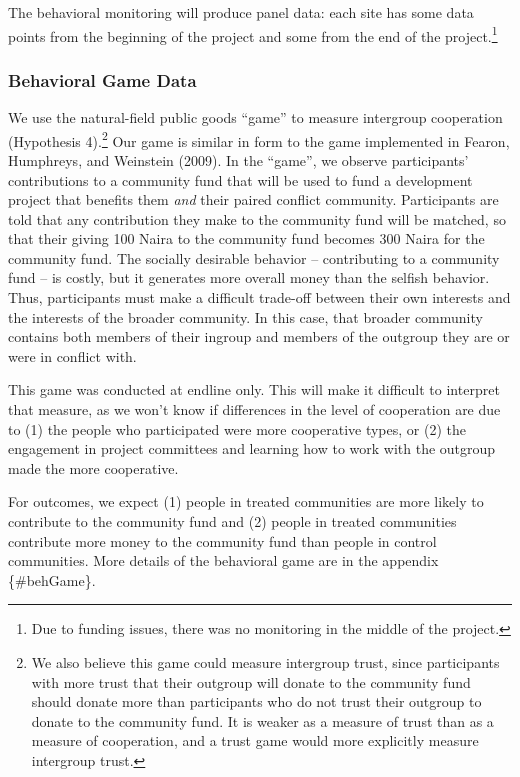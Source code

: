 \documentclass[
]{article}
\begin{document}
The behavioral monitoring will produce panel data: each site has some
data points from the beginning of the project and some from the end of
the project.\footnote{Due to funding issues, there was no monitoring in
  the middle of the project.}

\hypertarget{behavioral-game-data}{%
\subsubsection{Behavioral Game Data}\label{behavioral-game-data}}

We use the natural-field public goods ``game'' to measure intergroup
cooperation (Hypothesis 4).\footnote{We also believe this game could
  measure intergroup trust, since participants with more trust that
  their outgroup will donate to the community fund should donate more
  than participants who do not trust their outgroup to donate to the
  community fund. It is weaker as a measure of trust than as a measure
  of cooperation, and a trust game would more explicitly measure
  intergroup trust.} Our game is similar in form to the game implemented
in Fearon, Humphreys, and Weinstein (2009). In the ``game'', we observe
participants' contributions to a community fund that will be used to
fund a development project that benefits them \emph{and} their paired
conflict community. Participants are told that any contribution they
make to the community fund will be matched, so that their giving 100
Naira to the community fund becomes 300 Naira for the community fund.
The socially desirable behavior -- contributing to a community fund --
is costly, but it generates more overall money than the selfish
behavior. Thus, participants must make a difficult trade-off between
their own interests and the interests of the broader community. In this
case, that broader community contains both members of their ingroup and
members of the outgroup they are or were in conflict with.

This game was conducted at endline only. This will make it difficult to
interpret that measure, as we won't know if differences in the level of
cooperation are due to (1) the people who participated were more
cooperative types, or (2) the engagement in project committees and
learning how to work with the outgroup made the more cooperative.

For outcomes, we expect (1) people in treated communities are more
likely to contribute to the community fund and (2) people in treated
communities contribute more money to the community fund than people in
control communities. More details of the behavioral game are in the
appendix \{\#behGame\}.
\end{document}
